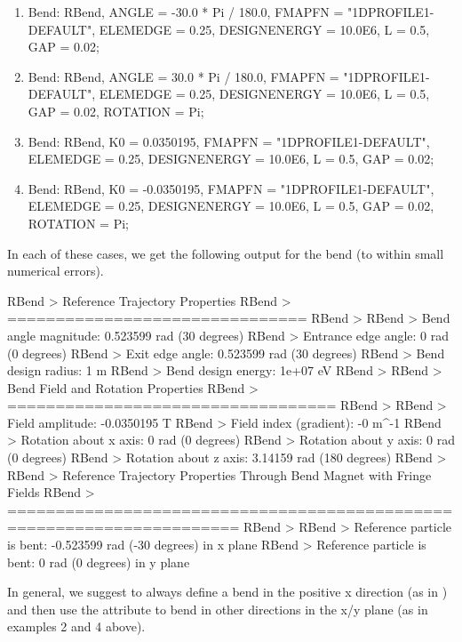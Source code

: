\begin{enumerate}
\item
\begin{example}
Bend: RBend, ANGLE = -30.0 * Pi / 180.0,
	     FMAPFN = "1DPROFILE1-DEFAULT",
	     ELEMEDGE = 0.25,
	     DESIGNENERGY = 10.0E6,
	     L = 0.5,
	     GAP = 0.02;
\end{example}
\item
\begin{example}
Bend: RBend, ANGLE = 30.0 * Pi / 180.0,
	     FMAPFN = "1DPROFILE1-DEFAULT",
	     ELEMEDGE = 0.25,
	     DESIGNENERGY = 10.0E6,
	     L = 0.5,
	     GAP = 0.02,
             ROTATION = Pi;
\end{example}
\item
\begin{example}
Bend: RBend, K0 = 0.0350195,
	     FMAPFN = "1DPROFILE1-DEFAULT",
	     ELEMEDGE = 0.25,
	     DESIGNENERGY = 10.0E6,
	     L = 0.5,
	     GAP = 0.02;
\end{example}
\item
\begin{example}
Bend: RBend, K0 = -0.0350195,
	     FMAPFN = "1DPROFILE1-DEFAULT",
	     ELEMEDGE = 0.25,
	     DESIGNENERGY = 10.0E6,
	     L = 0.5,
	     GAP = 0.02,
             ROTATION = Pi;
\end{example}
\end{enumerate}
In each of these cases, we get the following output for the bend (to within small numerical errors).

\begin{example}
RBend > Reference Trajectory Properties
RBend > ===============================
RBend >
RBend > Bend angle magnitude:    0.523599 rad (30 degrees)
RBend > Entrance edge angle:     0 rad (0 degrees)
RBend > Exit edge angle:         0.523599 rad (30 degrees)
RBend > Bend design radius:      1 m
RBend > Bend design energy:      1e+07 eV
RBend >
RBend > Bend Field and Rotation Properties
RBend > ==================================
RBend >
RBend > Field amplitude:         -0.0350195 T
RBend > Field index (gradient):  -0 m^-1
RBend > Rotation about x axis:   0 rad (0 degrees)
RBend > Rotation about y axis:   0 rad (0 degrees)
RBend > Rotation about z axis:   3.14159 rad (180 degrees)
RBend >
RBend > Reference Trajectory Properties Through Bend Magnet with Fringe Fields
RBend > ======================================================================
RBend >
RBend > Reference particle is bent: -0.523599 rad (-30 degrees) in x plane
RBend > Reference particle is bent: 0 rad (0 degrees) in y plane
\end{example}
In general, we suggest to always define a bend in the positive x
direction (as in ) and then use the  attribute to bend in other
directions in the x/y plane (as in examples 2 and 4 above).


